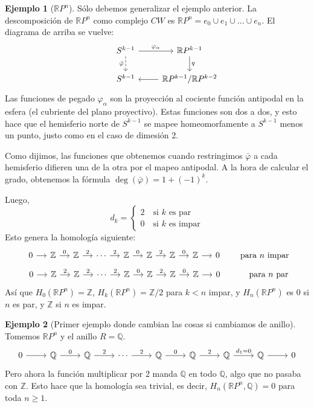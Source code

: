 \documentclass[spanish]{book}
\theoremstyle{definition}
\newtheorem*{ejem}{Ejemplo}
\newcommand{\R}{\mathbb{R}}
\newcommand{\Z}{\mathbb{Z}}
\newcommand{\Q}{\mathbb{Q}}
\begin{document}
	\begin{ejem}[$\R P^n$]
		Sólo debemos generalizar el ejemplo anterior. La descomposición de $\R P^n$ como complejo $CW$ es $\R P^n=e_0\cup e_1\cup...\cup e_n$. El diagrama de arriba se vuelve:
		\[\begin{tikzcd}
			& S^{k-1} \arrow[r, "\varphi_\alpha"] \arrow[d, dashed,swap, "\bar\varphi"] & \mathbb{R}P^{k-1} \arrow[d, "q"] \\
			& S^{k-1} & \mathbb{R}P^{k-1}/\mathbb{R}P^{k-2} \arrow[l]
		\end{tikzcd}\]
		Las funciones de pegado $\varphi_\alpha$ son la proyección al cociente función antipodal en la esfera (el cubriente del plano proyectivo). Estas funciones son dos a dos, y esto hace que el hemisferio norte de $S^{k-1}$ se mapee homeomorfamente a $S^{k-1}$ menos un punto, justo como en el caso de dimesión 2.
		
		Como dijimos, las funciones que obtenemos cuando restringimos $\bar\varphi$ a cada hemisferio difieren una de la otra por el mapeo antipodal. A la hora de calcular el grado, obtenemos la fórmula $\deg (\bar{\varphi})=1+(-1)^k$.
		
		Luego,
		\[d_k=\begin{cases}2\quad\text{si }k\text{ es par}\\0\quad\text{si }k\text{ es impar}\end{cases}\]
		Esto genera la homología siguiente:
		\[\begin{tikzcd}[column sep=small]
			0 \arrow[r] & \mathbb{Z} \arrow[r, "0"] & \mathbb{Z} \arrow[r, "2"] & \cdots \arrow[r, "2"] & \mathbb{Z} \arrow[r, "0"] & \mathbb{Z} \arrow[r, "2"] & \mathbb{Z} \arrow[r, "0"] & \mathbb{Z} \arrow[r] & 0
		\end{tikzcd}\qquad\text{para }n\text{ impar}\]
		\[\begin{tikzcd}[column sep=small]
			0 \arrow[r] & \mathbb{Z} \arrow[r, "2"] & \mathbb{Z} \arrow[r, "2"] & \cdots \arrow[r, "2"] & \mathbb{Z} \arrow[r, "0"] & \mathbb{Z} \arrow[r, "2"] & \mathbb{Z} \arrow[r, "0"] & \mathbb{Z} \arrow[r] & 0
		\end{tikzcd}\qquad\quad\text{para }n\text{ par}
		\]
		Así que $H_0(\R P^n)=\Z$, $H_k(\R P^n)=\Z/2$ para $k<n$ impar,  y $H_n(\R P^n)$ es $0$ si $n$ es par, y $\Z$ si $n$ es impar.
	\end{ejem}
	\begin{ejem}[Primer ejemplo donde cambian las cosas si cambiamos de anillo]
		Tomemos $\R P^n$ y el anillo $R=\Q$.
		\[\begin{tikzcd}
			0 \arrow[r] & \mathbb{Q} \arrow[r, "0"] & \mathbb{Q} \arrow[r, "2"] & \cdots \arrow[r, "2"] & \mathbb{Q} \arrow[r, "0"] & \mathbb{Q} \arrow[r, "2"] & \mathbb{Q} \arrow[r, "d_1=0"] & \mathbb{Q} \arrow[r] & 0
		\end{tikzcd}\]
		Pero ahora la función multiplicar por 2 manda $\Q$ en todo $\Q$, algo que no pasaba con $\Z$. Esto hace que la homología sea trivial, es decir, $H_n(\R P^n,\Q)=0$ para toda $n\geq1$.
	\end{ejem}
\end{document}

